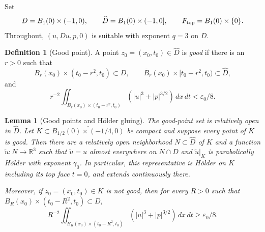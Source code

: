 \documentclass[11pt,letterpaper]{article}
\numberwithin{equation}{section}
\theoremstyle{plain}
\newtheorem{lemma}[theorem]{Lemma}
\theoremstyle{definition}
\newtheorem{definition}[theorem]{Definition}
\theoremstyle{remark}
\begin{document}
Set
\[
 D=B_1(0)\times(-1,0),\qquad
 \widehat D=B_1(0)\times(-1,0],\qquad F_{\rm top}=B_1(0)\times\{0\}.
\]
Throughout, $(u,Du,p,0)$ is suitable with exponent $q=3$ on $D$.

\begin{definition}[Good point]\label{def:good-point}
A point $z_0=(x_0,t_0)\in\widehat D$ is \emph{good} if there is an $r>0$
such that
\[
 B_r(x_0)\times(t_0-r^2,t_0)\subset D,\qquad
 \overline B_r(x_0)\times[t_0-r^2,t_0)\subset\widehat D,
\]
and
\[
 r^{-2}\iint_{B_r(x_0)\times(t_0-r^2,t_0)}
       (|u|^3+|p|^{3/2})\,dx\,dt<\varepsilon_0/8.
\]
\end{definition}

\begin{lemma}[Good points and Hölder gluing]\label{lem:good-open-glue}
The good-point set is relatively open in $\widehat D$.  Let
$K\subset\overline{B_{1/2}(0)\times(-1/4,0)}$ be compact and suppose every
point of $K$ is good.  Then there are a relatively open neighborhood
$N\subset\widehat D$ of $K$ and a function $\widetilde u:N\to\mathbb R^3$
such that $\widetilde u=u$ almost everywhere on $N\cap D$ and
$\widetilde u|_K$ is parabolically Hölder with exponent $\gamma_0$.
In particular, this representative is Hölder on $K$ including its top
face $t=0$, and extends continuously there.

Moreover, if $z_0=(x_0,t_0)\in K$ is not good, then for every $R>0$ such
that $B_R(x_0)\times(t_0-R^2,t_0)\subset D$,
\begin{equation}\label{eq:bad-point-lower-bound}
 R^{-2}\iint_{B_R(x_0)\times(t_0-R^2,t_0)}
       (|u|^3+|p|^{3/2})\,dx\,dt\ge\varepsilon_0/8.
\end{equation}
\end{lemma}
\end{document}
